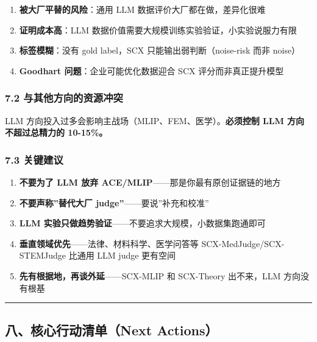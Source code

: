 \documentclass[
  12pt,
]{ctexart}
\providecommand{\tightlist}{%
  \setlength{\itemsep}{0pt}\setlength{\parskip}{0pt}}
\begin{document}
\begin{enumerate}
\def\labelenumi{\arabic{enumi}.}
\tightlist
\item
  \textbf{被大厂平替的风险}：通用 LLM 数据评价大厂都在做，差异化很难
\item
  \textbf{证明成本高}：LLM
  数据价值需要大规模训练实验验证，小实验说服力有限
\item
  \textbf{标签模糊}：没有 gold label，SCX 只能输出弱判断（noise-risk
  而非 noise）
\item
  \textbf{Goodhart 问题}：企业可能优化数据迎合 SCX 评分而非真正提升模型
\end{enumerate}

\subsubsection{7.2
与其他方向的资源冲突}\label{ux4e0eux5176ux4ed6ux65b9ux5411ux7684ux8d44ux6e90ux51b2ux7a81}

LLM 方向投入过多会影响主战场（MLIP、FEM、医学）。\textbf{必须控制 LLM
方向不超过总精力的 10-15\%。}

\subsubsection{7.3 关键建议}\label{ux5173ux952eux5efaux8bae}

\begin{enumerate}
\def\labelenumi{\arabic{enumi}.}
\tightlist
\item
  \textbf{不要为了 LLM 放弃 ACE/MLIP}------那是你最有原创证据链的地方
\item
  \textbf{不要声称''替代大厂 judge''}------要说''补充和校准''
\item
  \textbf{LLM 实验只做趋势验证}------不要追求大规模，小数据集跑通即可
\item
  \textbf{垂直领域优先}------法律、材料科学、医学问答等
  SCX-MedJudge/SCX-STEMJudge 比通用 LLM judge 更有空间
\item
  \textbf{先有根据地，再谈外延}------SCX-MLIP 和 SCX-Theory 出不来，LLM
  方向没有根基
\end{enumerate}

\begin{center}\rule{0.5\linewidth}{0.5pt}\end{center}

\subsection{八、核心行动清单（Next
Actions）}\label{ux516bux6838ux5fc3ux884cux52a8ux6e05ux5355next-actions}
\end{document}
